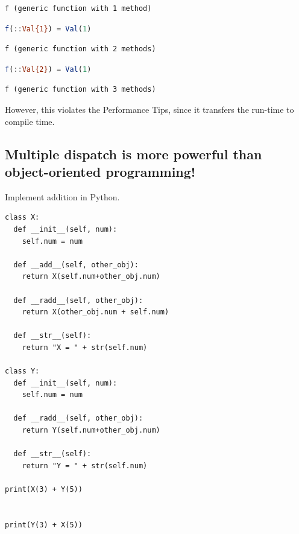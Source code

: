 \documentclass[
  notoc %
]{tufte-book}
\begin{document}
\begin{lstlisting}[language=Output]
f (generic function with 1 method)
\end{lstlisting}

\begin{lstlisting}[language=Julia]
f(::Val{1}) = Val(1)
\end{lstlisting}

\begin{lstlisting}[language=Output]
f (generic function with 2 methods)
\end{lstlisting}

\begin{lstlisting}[language=Julia]
f(::Val{2}) = Val(1)
\end{lstlisting}

\begin{lstlisting}[language=Output]
f (generic function with 3 methods)
\end{lstlisting}

However, this violates the Performance Tips, since it transfers the
run-time to compile time.

\hypertarget{multiple-dispatch-is-more-powerful-than-object-oriented-programming}{%
\subsection{Multiple dispatch is more powerful than object-oriented
programming!}\label{multiple-dispatch-is-more-powerful-than-object-oriented-programming}}

Implement addition in Python.

\begin{lstlisting}
class X:
  def __init__(self, num):
    self.num = num

  def __add__(self, other_obj):
    return X(self.num+other_obj.num)

  def __radd__(self, other_obj):
    return X(other_obj.num + self.num)

  def __str__(self):
    return "X = " + str(self.num)

class Y:
  def __init__(self, num):
    self.num = num

  def __radd__(self, other_obj):
    return Y(self.num+other_obj.num)

  def __str__(self):
    return "Y = " + str(self.num)

print(X(3) + Y(5))


print(Y(3) + X(5))
\end{lstlisting}
\end{document}
